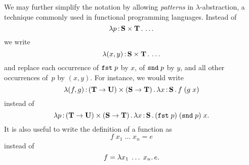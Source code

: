We may further simplify the notation by allowing \emph{patterns} in
$\lambda$-abstraction, a technique commonly used in functional
programming languages. Instead of
%
\begin{equation*}
  \lambda p \,{:}\, \mathbf{S} \times \mathbf{T}\,.\,\ldots
\end{equation*}
%
we write
%
\begin{equation*}
  \lambda (x,y) \,{:}\, \mathbf{S} \times \mathbf{T}\,.\,\ldots
\end{equation*}
%
and replace each occurrence of $\mathtt{fst}\;p$ by $x$, of $\mathtt{snd}\;p$
by $y$, and all other occurrences of~$p$ by $(x,y)$. For instance, we
would write
%
\begin{equation*}
  \lambda (f,g) \,{:}\, (\mathbf{T} \to \mathbf{U}) \times (\mathbf{S} \to \mathbf{T})\,.\,
    \lambda x \,{:}\, \mathbf{S}\,.\,f\;(g\;x)
\end{equation*}
%
instead of
%
\begin{equation*}
  \lambda p \,{:}\, (\mathbf{T} \to \mathbf{U}) \times (\mathbf{S} \to \mathbf{T})\,.\,
    \lambda x \,{:}\, \mathbf{S}\,.\,(\mathtt{fst}\;p)\;(\mathtt{snd}\;p)\;x.
\end{equation*}
%
It is also useful to write the definition of a function as
%
\begin{equation*}
  f\;x_1\;\ldots\; x_n = e
\end{equation*}
%
instead of
%
\begin{equation*}
  f = \lambda x_1\;\ldots\; x_n .\,e.
\end{equation*}

